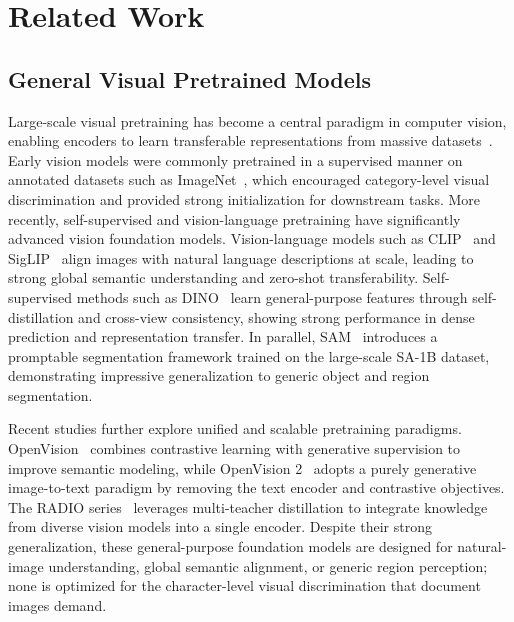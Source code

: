 \documentclass{article}
\begin{document}
\section{Related Work}
\label{sec:rela}

\subsection{General Visual Pretrained Models}
    Large-scale visual pretraining has become a central paradigm in computer vision, enabling encoders to learn transferable representations from massive datasets~\cite{pre9, pre6}. Early vision models were commonly pretrained in a supervised manner on annotated datasets such as ImageNet~\cite{imagenet}, which encouraged category-level visual discrimination and provided strong initialization for downstream tasks. More recently, self-supervised and vision-language pretraining have significantly advanced vision foundation models. Vision-language models such as CLIP~\cite{clip} and SigLIP~\cite{siglip,siglip2} align images with natural language descriptions at scale, leading to strong global semantic understanding and zero-shot transferability. Self-supervised methods such as DINO~\cite{dino,dinov3} learn general-purpose features through self-distillation and cross-view consistency, showing strong performance in dense prediction and representation transfer. In parallel, SAM~\cite{sam} introduces a promptable segmentation framework trained on the large-scale SA-1B dataset, demonstrating impressive generalization to generic object and region segmentation.

    Recent studies further explore unified and scalable pretraining paradigms. OpenVision~\cite{openvision} combines contrastive learning with generative supervision to improve semantic modeling, while OpenVision 2~\cite{openvision2} adopts a purely generative image-to-text paradigm by removing the text encoder and contrastive objectives. The RADIO series~\cite{radio,radio2d5} leverages multi-teacher distillation to integrate knowledge from diverse vision models into a single encoder. Despite their strong generalization, these general-purpose foundation models are designed for natural-image understanding, global semantic alignment, or generic region perception; none is optimized for the character-level visual discrimination that document images demand.
\end{document}
